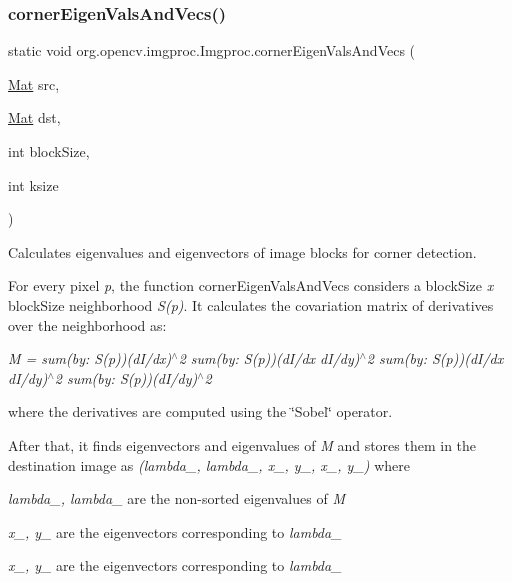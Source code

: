 \subsubsection{\texorpdfstring{corner\+Eigen\+Vals\+And\+Vecs()}{cornerEigenValsAndVecs()}\hspace{0.1cm}{\footnotesize\ttfamily [2/2]}}
{\footnotesize\ttfamily static void org.\+opencv.\+imgproc.\+Imgproc.\+corner\+Eigen\+Vals\+And\+Vecs (\begin{DoxyParamCaption}\item[{\mbox{\hyperlink{classorg_1_1opencv_1_1core_1_1_mat}{Mat}}}]{src,  }\item[{\mbox{\hyperlink{classorg_1_1opencv_1_1core_1_1_mat}{Mat}}}]{dst,  }\item[{int}]{block\+Size,  }\item[{int}]{ksize }\end{DoxyParamCaption})\hspace{0.3cm}{\ttfamily [static]}}

Calculates eigenvalues and eigenvectors of image blocks for corner detection.

For every pixel {\itshape p}, the function {\ttfamily corner\+Eigen\+Vals\+And\+Vecs} considers a {\ttfamily block\+Size} {\itshape x} {\ttfamily block\+Size} neighborhood {\itshape S(p)}. It calculates the covariation matrix of derivatives over the neighborhood as\+:

{\itshape M = sum(by\+: S(p))(d\+I/dx)$^\wedge$2 sum(by\+: S(p))(d\+I/dx d\+I/dy)$^\wedge$2 sum(by\+: S(p))(d\+I/dx d\+I/dy)$^\wedge$2 sum(by\+: S(p))(d\+I/dy)$^\wedge$2 }

where the derivatives are computed using the \char`\"{}\+Sobel\char`\"{} operator.

After that, it finds eigenvectors and eigenvalues of {\itshape M} and stores them in the destination image as {\itshape (lambda\+\_, lambda\+\_, x\+\_, y\+\_, x\+\_, y\+\_)} where


\begin{DoxyItemize}
\item {\itshape lambda\+\_, lambda\+\_} are the non-\/sorted eigenvalues of {\itshape M} 
\item {\itshape x\+\_, y\+\_} are the eigenvectors corresponding to {\itshape lambda\+\_} 
\item {\itshape x\+\_, y\+\_} are the eigenvectors corresponding to {\itshape lambda\+\_} 
\end{DoxyItemize}


